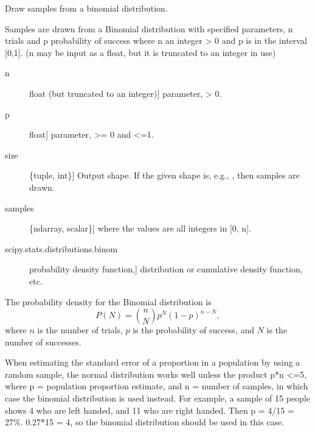 \documentclass[letterpaper,10pt,english]{sphinxmanual}
\begin{document}

\begin{fulllineitems}
\label{index:halla.stats.binomial}
Draw samples from a binomial distribution.

Samples are drawn from a Binomial distribution with specified
parameters, n trials and p probability of success where
n an integer \textgreater{} 0 and p is in the interval {[}0,1{]}. (n may be
input as a float, but it is truncated to an integer in use)
\begin{description}
\item[{n}] \leavevmode{[}float (but truncated to an integer){]}
parameter, \textgreater{} 0.

\item[{p}] \leavevmode{[}float{]}
parameter, \textgreater{}= 0 and \textless{}=1.

\item[{size}] \leavevmode{[}\{tuple, int\}{]}
Output shape.  If the given shape is, e.g., , then
 samples are drawn.

\end{description}
\begin{description}
\item[{samples}] \leavevmode{[}\{ndarray, scalar\}{]}
where the values are all integers in  {[}0, n{]}.

\end{description}
\begin{description}
\item[{scipy.stats.distributions.binom}] \leavevmode{[}probability density function,{]}
distribution or cumulative density function, etc.

\end{description}

The probability density for the Binomial distribution is
\begin{equation}P(N) = \binom{n}{N}p^N(1-p)^{n-N},\end{equation}
where $n$ is the number of trials, $p$ is the probability
of success, and $N$ is the number of successes.

When estimating the standard error of a proportion in a population by
using a random sample, the normal distribution works well unless the
product p*n \textless{}=5, where p = population proportion estimate, and n =
number of samples, in which case the binomial distribution is used
instead. For example, a sample of 15 people shows 4 who are left
handed, and 11 who are right handed. Then p = 4/15 = 27\%. 0.27*15 = 4,
so the binomial distribution should be used in this case.


\end{fulllineitems}
\end{document}
